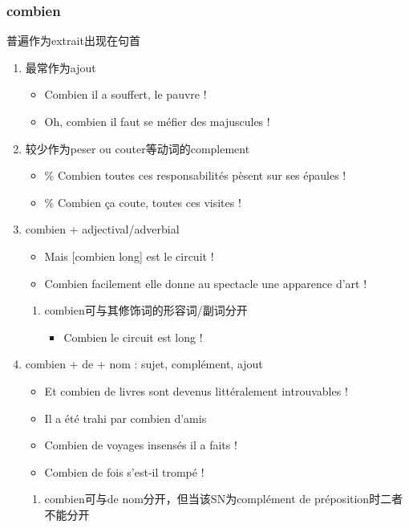 \documentclass[UTF8]{report}
\begin{document}
\subsubsection{combien}
普遍作为extrait出现在句首
\begin{enumerate}
    \item 最常作为ajout
    \begin{itemize}
        \item Combien il a souffert, le pauvre !
        \item Oh, combien il faut se méfier des majuscules !
    \end{itemize}
    \item 较少作为peser ou couter等动词的complement
    \begin{itemize}
        \item \% Combien toutes ces responsabilités pèsent sur ses épaules !
        \item \% Combien ça coute, toutes ces visites !
    \end{itemize}
    \item combien +  adjectival/adverbial
    \begin{itemize}
        \item Mais [combien long] est le circuit !
        \item Combien facilement elle donne au spectacle une apparence d’art ! 
    \end{itemize}
    \begin{enumerate}
        \item combien可与其修饰词的形容词/副词分开
        \begin{itemize}
            \item Combien le circuit est long !
        \end{itemize}
    \end{enumerate}
    \item combien + de + nom : sujet, complément, ajout
    \begin{itemize}
        \item Et combien de livres sont devenus littéralement introuvables !
        \item Il a été trahi par combien d’amis
        \item Combien de voyages insensés il a faits !
        \item Combien de fois s’est-il trompé !
    \end{itemize}
    \begin{enumerate}
        \item combien可与de nom分开，但当该SN为complément de préposition时二者不能分开

\end{enumerate}
\end{enumerate}
\end{document}

